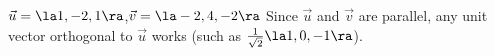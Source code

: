 {$\vec u = \la 1,-2,1\ra$,\quad $\vec v=\la -2,4,-2\ra$
}
{Since $\vec u$ and $\vec v$ are parallel, any unit vector orthogonal to $\vec u$ works (such as $\frac{1}{\sqrt{2}}\la 1,0,-1\ra$).
}
